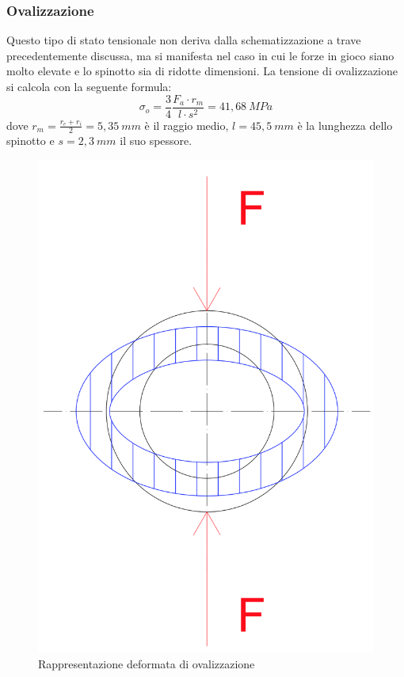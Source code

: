 \subsubsection{Ovalizzazione} 
Questo tipo di stato tensionale non deriva dalla schematizzazione a trave precedentemente discussa, ma si manifesta nel caso in cui le forze in gioco siano molto elevate e lo spinotto sia di ridotte dimensioni. 
La tensione di ovalizzazione si calcola con la seguente formula:
\begin{equation}
    \sigma_o=\frac{3}{4}\frac{F_a\cdot r_m}{l\cdot s^2}=41,68\ MPa
\end{equation}
dove $r_m=\frac{r_e+r_i}{2}=5,35\ mm$ è il raggio medio, $l=45,5\ mm$ è la lunghezza dello spinotto e $s=2,3\ mm$ il suo spessore.
\begin{figure}[h]
    \centering
    \includegraphics[scale=0.3]{Immagini/OvalizzazioneSezioneSpinotto.png}
    \caption{Rappresentazione deformata di ovalizzazione}
    \label{fig:OvalizzazioneSezioneSpinotto}
\end{figure}
\newpage
